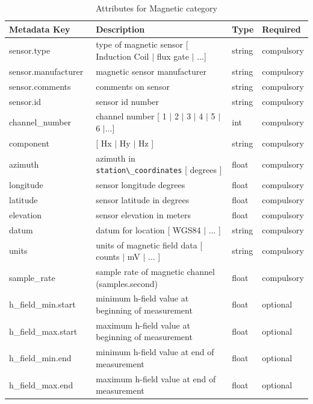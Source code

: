 \documentclass{article}
\begin{document}
\begin{table}[htb!]
    \caption[Attributes for Magnetic Channel]{Attributes for Magnetic category}
    \begin{tabular}{|l|p{3in}|l|l|}
        \hline
        \textbf{Metadata Key} & \textbf{Description} & \textbf{Type} & \textbf{Required} \\ \hline
        sensor.type\ & type of magnetic sensor [ Induction Coil $|$ flux gate $|$ ...] & string & compulsory \\ \hline
        sensor.manufacturer\ & magnetic sensor manufacturer & string &  compulsory \\ \hline
        sensor.comments\ & comments on sensor & string & compulsory \\ \hline
        sensor.id\ & sensor id number & string &  compulsory \\ \hline
        channel\_number\ & channel number [ 1 $|$ 2 $|$ 3 $|$ 4 $|$ 5 $|$ 6 $|$...] & int &  compulsory \\ \hline
        component\ & [ Hx $|$ Hy $|$ Hz ] & string  &  compulsory \\ \hline
        azimuth\ & azimuth in \verb|station\_coordinates| [ degrees ]& float & compulsory \\ \hline
        longitude\ & sensor longitude degrees & float & compulsory \\ \hline
        latitude\ & sensor latitude in degrees & float &  compulsory \\ \hline
        elevation\ & sensor elevation in meters & float &  compulsory \\ \hline
        datum\ & datum for location [ WGS84 $|$ ... ] & string &  compulsory\\ \hline
        units\ & units of magnetic field data [ counts $|$ mV $|$ ... ] & string &  compulsory \\ \hline
        sample\_rate\ & sample rate of magnetic channel (samples.second) & float &  compulsory \\ \hline
        h\_field\_min.start\ & minimum h-field value at beginning of measurement & float &  optional \\ \hline
        h\_field\_max.start\ & maximum h-field value at beginning of measurement & float &  optional\\ \hline
        h\_field\_min.end\ & minimum h-field value at end of measurement & float &  optional\\ \hline
        h\_field\_max.end\ & maximum h-field value at end of measurement & float &  optional\\ \hline

\end{tabular}
\end{table}
\end{document}
